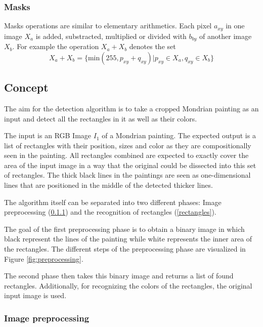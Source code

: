 \documentclass[serif,article,noparskip]{agse-thesis}
\begin{document}
\subsubsection{Masks}

Masks operations are similar to elementary arithmetics. Each pixel $a_{xy}$ in
one image  $X_a$ is added, substracted, multiplied or divided with $b_{by}$ of
another image $X_b$. For example the operation $X_a + X_b$ denotes the set
$$X_a + X_b = \{\mathrm{min}(255, p_{xy} + q_{xy}) | p_{xy} \in X_a, q_{xy} \in X_b\}$$

\subsection{Concept} \label{concept}

The aim for the detection algorithm is to take a cropped Mondrian painting as
an input and detect all the rectangles in it as well as their colors.

The input is an RGB Image $I_1$ of a Mondrian painting. The expected output is a
list of rectangles with their position, sizes and color as they are
compositionally seen in the painting. All rectangles combined are expected to
exactly cover the area of the input image in a way that the original could be
dissected into this set of rectangles. The thick black lines in the paintings
are seen as one-dimensional lines that are positioned in the middle of the
detected thicker lines.

The algorithm itself can be separated into two different phases: Image
preprocessing (\ref{preprocessing}) and the recognition of rectangles (\ref{rectangles}).

The goal of the first preprocessing phase is to obtain a binary image in which
black represent the lines of the painting while white represents the inner area
of the rectangles. The different steps of the preprocessing phase are visualized
in Figure \ref{fig:preprocessing}.

The second phase then takes this binary image and returns a list of found
rectangles. Additionally, for recognizing the colors of the rectangles, the
original input image is used.

\subsubsection{Image preprocessing} \label{preprocessing}
\end{document}
